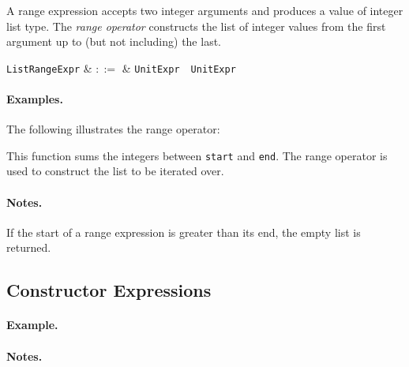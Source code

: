 A range expression accepts two integer arguments and produces a value of integer list type.  The {\em range operator} constructs the list of integer values from the first argument up to (but not including) the last.

\begin{syntax}
  \verb+ListRangeExpr+ & $::=$ & \verb+UnitExpr+\ \ \verb+UnitExpr+\\
\end{syntax}

\paragraph{Examples.}  The following illustrates the range operator:



This function sums the integers between \lstinline{start} and \lstinline{end}.  The range operator is used to construct the list to be iterated over.

\paragraph{Notes.}  If the start of a range expression is greater than its end, the empty list is returned.


\subsection{Constructor Expressions}
\label{c_expr_list_constructor}

\begin{syntax}
\end{syntax}

\paragraph{Example.}

\paragraph{Notes.}


